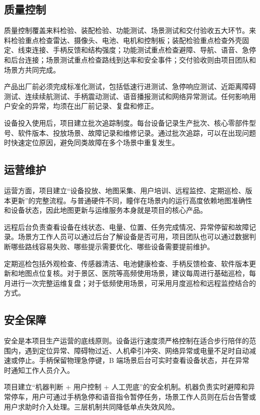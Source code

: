 \documentclass[a4paper,fontset=none]{ctexart}
\begin{document}
\subsection{质量控制}

质量控制覆盖来料检验、装配检验、功能测试、场景测试和交付验收五大环节。来料检验重点检查雷达、摄像头、电池、电机和控制板；装配检验重点检查外壳固定、线束连接、手柄反馈和结构强度；功能测试重点检查避障、导航、语音、急停和后台连接；场景测试重点检查路线到达率和安全事件；交付验收则由项目团队和场景方共同完成。

产品出厂前必须完成标准化测试，包括低速行进测试、急停响应测试、近距离障碍测试、连续续航测试、手柄震动测试、语音播报测试和网络异常测试。任何影响用户安全的异常，均须在出厂前记录、复盘和修正。

设备投入使用后，项目建立批次追踪制度。每台设备记录生产批次、核心零部件型号、软件版本、投放场景、故障记录和维修记录。通过批次追踪，可以在出现问题时快速定位原因，避免同类故障在多个场景中重复发生。

\subsection{运营维护}

运营方面，项目建立“设备投放、地图采集、用户培训、远程监控、定期巡检、版本更新”的完整流程。与普通硬件不同，瞳伴在场景内的运行高度依赖地图准确性和设备状态，因此地图更新与运维服务本身就是项目的核心产品。

远程后台负责查看设备在线状态、电量、位置、任务完成情况、异常停留和故障记录。场景方工作人员可以通过后台了解设备是否可用，项目团队也可以通过数据判断哪些路线容易失败、哪些提示需要优化、哪些设备需要提前维护。

定期巡检包括外观检查、传感器清洁、电池健康检查、手柄反馈检查、软件版本更新和地图点位复核。对于景区、医院等高频使用场景，建议每周进行基础巡检，每月进行一次完整运维复盘；对于低频使用场景，可采用月度巡检和远程监控结合的方式。

\subsection{安全保障}

安全是本项目生产运营的底线原则。设备运行速度须严格控制在适合步行陪伴的范围内，遇到定位异常、障碍物过近、人机牵引冲突、网络异常或电量不足时自动减速或停止。手柄保留物理急停键，B 端场景后台可实时查看设备状态，并在异常时通知工作人员介入。

项目建立“机器判断 + 用户控制 + 人工兜底”的安全机制。机器负责实时避障和异常停车，用户可通过手柄急停和语音指令暂停任务，场景工作人员则在后台告警或用户求助时介入处理。三层机制共同降低单点失效风险。
\end{document}
